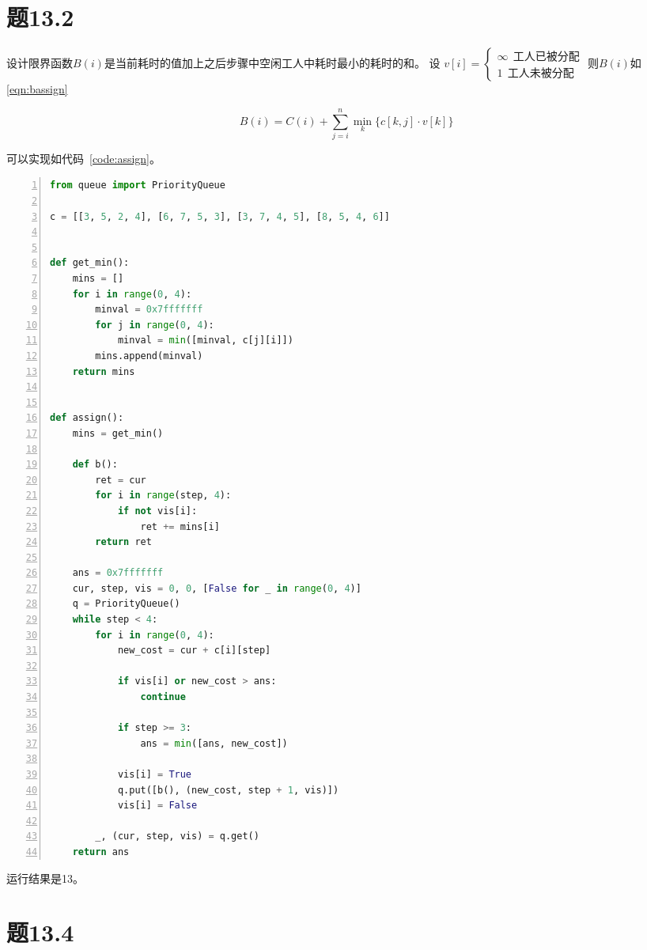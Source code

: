 \documentclass[a4paper,twoside]{article}
\begin{document}
\begin{spacing}{1.2}
\section{题13.2}

设计限界函数$B(i)$是当前耗时的值加上之后步骤中空闲工人中耗时最小的耗时的和。
设
$v[i]=\begin{cases}
	\infty \ \ \mbox{工人已被分配} \\
	1 \ \ \mbox{工人未被分配}
\end{cases}$
则$B(i)$如\eqref{eqn:bassign}


\begin{equation}
	\label{eqn:bassign}
	B(i)=C(i)+\sum_{j=i}^{n}\mathop{min}_k{\{c[k,j]\cdot v[k]\}}
\end{equation}

可以实现如代码~\ref{code:assign}。

\begin{lstlisting}[language=Python,numbers=left,style=PythonStyle,caption=工人分配问题,label={code:assign}]
from queue import PriorityQueue

c = [[3, 5, 2, 4], [6, 7, 5, 3], [3, 7, 4, 5], [8, 5, 4, 6]]


def get_min():
    mins = []
    for i in range(0, 4):
        minval = 0x7fffffff
        for j in range(0, 4):
            minval = min([minval, c[j][i]])
        mins.append(minval)
    return mins


def assign():
    mins = get_min()

    def b():
        ret = cur
        for i in range(step, 4):
            if not vis[i]:
                ret += mins[i]
        return ret

    ans = 0x7fffffff
    cur, step, vis = 0, 0, [False for _ in range(0, 4)]
    q = PriorityQueue()
    while step < 4:
        for i in range(0, 4):
            new_cost = cur + c[i][step]

            if vis[i] or new_cost > ans:
                continue

            if step >= 3:
                ans = min([ans, new_cost])

            vis[i] = True
            q.put([b(), (new_cost, step + 1, vis)])
            vis[i] = False

        _, (cur, step, vis) = q.get()
    return ans
\end{lstlisting}

运行结果是13。

\section{题13.4}


\end{spacing}
\end{document}
